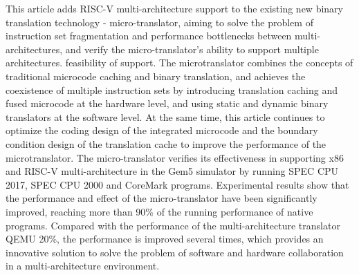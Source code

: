 This article adds RISC-V multi-architecture support to the existing new binary translation technology - micro-translator, aiming to solve the problem of instruction set fragmentation and performance bottlenecks between multi-architectures, and verify the micro-translator's ability to support multiple architectures. feasibility of support.
The microtranslator combines the concepts of traditional microcode caching and binary translation, and achieves the coexistence of multiple instruction sets by introducing translation caching and fused microcode at the hardware level, and using static and dynamic binary translators at the software level.
At the same time, this article continues to optimize the coding design of the integrated microcode and the boundary condition design of the translation cache to improve the performance of the microtranslator.
The micro-translator verifies its effectiveness in supporting x86 and RISC-V multi-architecture in the Gem5 simulator by running SPEC CPU 2017, SPEC CPU 2000 and CoreMark programs.
Experimental results show that the performance and effect of the micro-translator have been significantly improved, reaching more than 90\% of the running performance of native programs.
Compared with the performance of the multi-architecture translator QEMU 20\%, the performance is improved several times, which provides an innovative solution to solve the problem of software and hardware collaboration in a multi-architecture environment.


